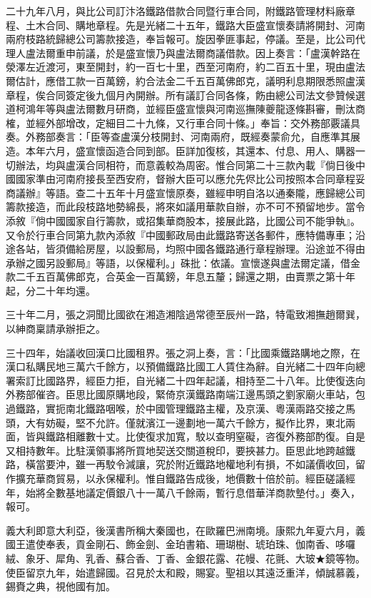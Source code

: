 \begin{pinyinscope}
二十九年八月，與比公司訂汴洛鐵路借款合同暨行車合同，附鐵路管理材料廠章程、土木合同、購地章程。先是光緒二十五年，鐵路大臣盛宣懷奏請將開封、河南兩府枝路統歸總公司籌款接造，奉旨報可。旋因拳匪事起，停議。至是，比公司代理人盧法爾重申前議，於是盛宣懷乃與盧法爾商議借款。因上奏言：「盧漢幹路在滎澤左近渡河，東至開封，約一百七十里，西至河南府，約二百五十里，現由盧法爾估計，應借工款一百萬鎊，約合法金二千五百萬佛郎克，議明利息期限悉照盧漢章程，俟合同簽定後九個月內開辦。所有議訂合同各條，飭由總公司法文參贊候選道柯鴻年等與盧法爾數月研商，並經臣盛宣懷與河南巡撫陳夔龍逐條斟審，刪汰商榷，並經外部增改，定細目二十九條，又行車合同十條。」奉旨：交外務部覈議具奏。外務部奏言：「臣等查盧漢分枝開封、河南兩府，既經奏蒙俞允，自應準其展造。本年六月，盛宣懷函造合同到部。臣詳加復核，其還本、付息、用人、購器一切辦法，均與盧漢合同相符，而意義較為周密。惟合同第二十三款內載『倘日後中國國家準由河南府接長至西安府，督辦大臣可以應允先侭比公司按照本合同章程妥商議辦』等語。查二十五年十月盛宣懷原奏，雖經申明自洛以通秦隴，應歸總公司籌款接造，而此段枝路地勢綿長，將來如議用華款自辦，亦不可不預留地步。當令添敘『倘中國國家自行籌款，或招集華商股本，接展此路，比國公司不能爭執』。又令於行車合同第九款內添敘『中國郵政局由此鐵路寄送各郵件，應特備專車；沿途各站，皆須備給房屋，以設郵局，均照中國各鐵路通行章程辦理。沿途並不得由承辦之國另設郵局』等語，以保權利。」硃批：依議。宣懷遂與盧法爾定議，借金款二千五百萬佛郎克，合英金一百萬鎊，年息五釐；歸還之期，由賣票之第十年起，分二十年均還。

三十年二月，張之洞聞比國欲在湘造湘陰過常德至辰州一路，特電致湘撫趙爾巽，以紳商稟請承辦拒之。

三十四年，始議收回漢口比國租界。張之洞上奏，言：「比國乘鐵路購地之際，在漢口私購民地三萬六千餘方，以預備鐵路比國工人賃住為辭。自光緒二十四年向總署索訂比國路界，經臣力拒，自光緒二十四年起議，相持至二十八年。比使復迭向外務部催咨。臣思比國原購地段，緊倚京漢鐵路南端江邊馬頭之劉家廟火車站，包過鐵路，實扼南北鐵路咽喉，於中國管理鐵路主權，及京漢、粵漢兩路交接之馬頭，大有妨礙，堅不允許。僅就濱江一邊劃地一萬六千餘方，擬作比界，東北兩面，皆與鐵路相離數十丈。比使復求加寬，駮以查明窒礙，咨復外務部酌復。自是又相持數年。比駐漢領事將所買地契送交關道稅印，要挾甚力。臣思此地跨越鐵路，橫當要沖，雖一再駮令減讓，究於附近鐵路地權地利有損，不如議價收回，留作擴充華商貿易，以永保權利。惟自鐵路告成後，地價數十倍於前。經臣磋議經年，始將全數基地議定價銀八十一萬八千餘兩，暫行息借華洋商款墊付。」奏入，報可。

義大利即意大利亞，後漢書所稱大秦國也，在歐羅巴洲南境。康熙九年夏六月，義國王遣使奉表，貢金剛石、飾金劍、金珀書箱、珊瑚樹、琥珀珠、伽南香、哆囉絨、象牙、犀角、乳香、蘇合香、丁香、金銀花露、花幔、花氈、大玻★鏡等物。使臣留京九年，始遣歸國。召見於太和殿，賜宴。聖祖以其遠泛重洋，傾誠慕義，錫賚之典，視他國有加。


\end{pinyinscope}
